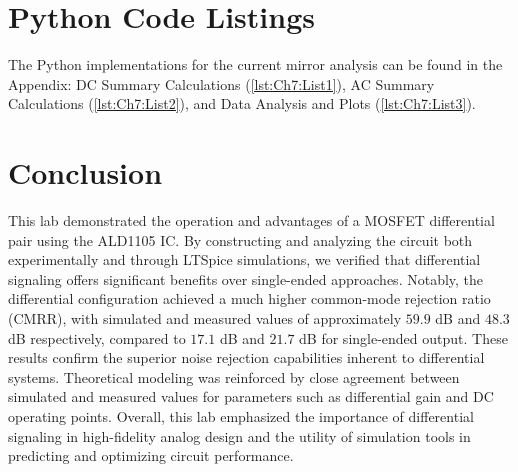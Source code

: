 \section{Python Code Listings}

The Python implementations for the current mirror analysis can be found in the Appendix: DC Summary Calculations (\cref{lst:Ch7:List1}), AC Summary Calculations (\cref{lst:Ch7:List2}), and Data Analysis and Plots (\cref{lst:Ch7:List3}).

\section{Conclusion}
\vspace{0.25cm}
\justifying
This lab demonstrated the operation and advantages of a MOSFET differential pair using the ALD1105 IC. By constructing and analyzing the circuit both experimentally and through LTSpice simulations, we verified that differential signaling offers significant benefits over single-ended approaches. Notably, the differential configuration achieved a much higher common-mode rejection ratio (CMRR), with simulated and measured values of approximately $59.9$ dB and $48.3$ dB respectively, compared to $17.1$ dB and $21.7$ dB for single-ended output. These results confirm the superior noise rejection capabilities inherent to differential systems. Theoretical modeling was reinforced by close agreement between simulated and measured values for parameters such as differential gain and DC operating points. Overall, this lab emphasized the importance of differential signaling in high-fidelity analog design and the utility of simulation tools in predicting and optimizing circuit performance.

\clearpage
\printbibliography[heading=subbibliography]